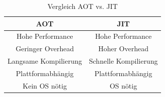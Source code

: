 \begin{table}[ht]
    \begin{center}
        \begin{tabular}{| c | c |}
            \hline
            \textbf{AOT}          & \textbf{JIT}          \\
            \hline
            \hline
            Hohe Performance      & Hohe Performance      \\
            \hline
            Geringer Overhead     & Hoher Overhead        \\
            \hline
            Langsame Kompilierung & Schnelle Kompilierung \\
            \hline
            Plattformabhängig     & Plattformabhängig     \\
            \hline
            Kein OS nötig         & OS nötig              \\
            \hline
        \end{tabular}
    \end{center}
    \caption{Vergleich AOT vs. JIT}
    \label{vergleich_table}
\end{table}

